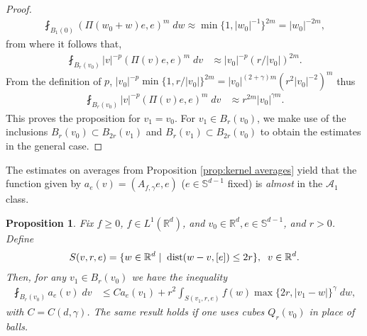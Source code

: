 \documentclass[12pt,american]{amsart}
\numberwithin{equation}{section}
\theoremstyle{plain}
\newtheorem{prop}[thm]{Proposition}
\theoremstyle{definition}                  %
\begin{document}
\begin{proof}
  \begin{align*}
    \fint_{B_1(0)}(\Pi(w_0+w)e,e)^m\;dw \approx \min\{1,|w_0|^{-1}\}^{2m} = |w_0|^{-2m},
  \end{align*}
  from where it follows that,
  \begin{align*}
    \fint_{B_r(v_0)}|v|^{-p}(\Pi(v)e,e)^m\;dv & \approx |v_0|^{-p} (r/|v_0|)^{2m}.
  \end{align*}  
  From the definition of $p$, $ |v_0|^{-p} \min\{1,r/|v_0|\}^{2m} = |v_0|^{(2+\gamma)m} (r^2|v_0|^{-2})^m$ thus
  \begin{align*}
    \fint_{B_r(v_0)}|v|^{-p}(\Pi(v)e,e)^m\;dv & \approx r^{2m}|v_0|^{\gamma m}.
  \end{align*}  
  This proves the proposition for $v_1 = v_0$. For $v_1 \in B_r(v_0)$, we make use of the inclusions $B_r(v_0)\subset B_{2r}(v_1)$ and $B_{r}(v_1) \subset B_{2r}(v_0)$ to obtain the estimates in the general case.
\end{proof}

The estimates on averages from Proposition \ref{prop:kernel averages} yield that the function given by $a_e(v)=(A_{f,\gamma}e,e)$ ($e\in\mathbb{S}^{d-1}$ fixed) is \emph{almost} in the $\mathcal{A}_1$ class.
\begin{prop}\label{prop:weight a_e is almost A1}
  Fix $f\geq 0$, $f\in L^1(\mathbb{R}^d)$, and $v_0 \in \mathbb{R}^d, e\in \mathbb{S}^{d-1}$, and $r>0$. Define
  \begin{align*}
    S(v,r,e) = \{ w \in\mathbb{R}^d \mid\; \textnormal{dist}(w-v,[e]) \leq 2r\},\;\;v \in \mathbb{R}^d.
  \end{align*}
  Then, for any $v_1 \in B_r(v_0)$ we have the inequality	
  \begin{align*}
    \fint_{B_r(v_0)}a_e(v)\;dv  & \leq Ca_e(v_1)+r^2\int_{S(v_1,r,e)}f(w)\max\{2r,|v_1-w|\}^\gamma\;dw,
  \end{align*}
  with $C = C(d,\gamma)$. The same result holds if one uses cubes $Q_r(v_0)$ in place of balls.
\end{prop}
\end{document}
